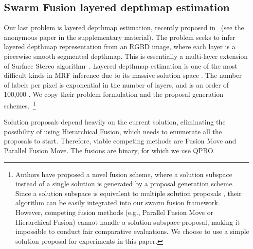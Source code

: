 \subsection{Swarm Fusion layered depthmap estimation}

Our last problem is layered depthmap estimation, recently proposed
in~\cite{layered_depthmap} (see the anonymous paper in the
supplementary material).  The problem seeks to infer layered depthmap
representation from an RGBD image, where each layer is a piecewise
smooth segmented depthmap. This is essentially a multi-layer extension
of Surface Stereo algorithm~\cite{surface_stereo}.
%
Layered depthmap estimation is one of the most difficult kinds in MRF
inference due to its massive solution space . The number of labels per
pixel is exponential in the number of layers, and is an order of 100,000
 . We copy their problem
formulation and the proposal generation schemes.~\footnote{Authors have
proposed a novel fusion scheme, where a solution subspace instead of a
single solution is generated by a proposal generation scheme. Since a
solution subspace is equivalent to multiple solution proposals , their
algorithm can be easily integrated into our swarm fusion framework.
However, competing fusion methods (e.g., Parallel Fusion Move or
Hierarchical Fusion) cannot handle a solution subspace proposal, making
it impossible to conduct fair comparative evaluations. We choose to use
a simple solution proposal for experiments in this paper.}


\noindent Solution proposals depend heavily on the current solution,
eliminating the possibility of using Hierarchical Fusion, which needs to
enumerate all the proposals to start. Therefore, viable competing
methods are Fusion Move and Parallel Fusion Move.
%
%
The fusions are binary, for which we use QPBO.

